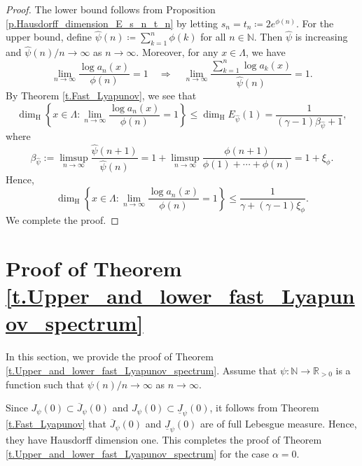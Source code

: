 \documentclass[12pt,reqno]{amsart}
\renewcommand{\=}{\coloneqq}
\theoremstyle{plain}
\begin{document}
\begin{proof}
The lower bound follows from Proposition \ref{p.Hausdorff_dimension_E_s_n_t_n} by letting $s_n=t_n \coloneqq 2e^{\phi(n)}$. For the upper bound, define $\widehat{\psi}(n)\coloneqq \sum_{k=1}^
        n \phi(k)$ for all $n \in \mathbb N$. Then $\widehat{\psi}$ is increasing and $\widehat{\psi}(n)/n\to \infty$ as $n \to \infty$. Moreover, for any $x\in \Lambda$, we have
        \begin{equation*}
                \lim_{n\to \infty}\frac{\log a_n(x)}{\phi(n)}=1
                 \quad \Longrightarrow \quad
                \lim_{n\to \infty}\frac{\sum^n_{k=1}\log a_k(x)}{\widehat{\psi}(n)}=1.
        \end{equation*}
        By Theorem \ref{t.Fast_Lyapunov}, we see that
        \begin{equation*}
                \dim_{\mathrm{H}}\left\{ x\in \Lambda:\lim_{n\to \infty}
                \frac{\log a_n(x)}{\phi(n)}=1 \right\}
                \leq \dim_{\mathrm{H}}E_{\widehat{\psi}}(1)
                =\frac{1}{(\gamma-1)\beta_{\widehat{\psi}}+1},
        \end{equation*}
   where
        \begin{equation*}
                \beta_{\widehat{\psi}}
                :=\limsup_{n\to\infty}
                \frac{\widehat{\psi}(n+1)}{\widehat{\psi}(n)}
                =1+\limsup_{n\to\infty}\frac{\phi(n+1)}{\phi(1)+\cdots +\phi(n)}
                =1+\xi_\phi.
        \end{equation*}
Hence,  \begin{equation*}
                \dim_{\mathrm{H}}
                \left\{x\in  \Lambda:\lim_{n\to \infty }
                \frac{\log a_n(x)}{\phi(n)}=1\right\}
                \leq \frac{1}{\gamma+(\gamma-1)\xi_\phi}.
        \end{equation*}
        We complete the proof.
\end{proof}


\section{Proof of Theorem \ref{t.Upper_and_lower_fast_Lyapunov_spectrum}}\label{s.proofoftheoremb}

In this section, we provide the proof of Theorem \ref{t.Upper_and_lower_fast_Lyapunov_spectrum}.
Assume that $\psi:\mathbb{N}\to\mathbb{R}_{>0}$ is a function such that $\psi(n)/n \to \infty$ as $n\to \infty$.

Since $J_\psi(0) \subset \overline{J}_\psi(0)$ and $J_\psi(0) \subset \underline{J}_\psi(0)$, it follows from Theorem \ref{t.Fast_Lyapunov} that $\overline{J}_\psi(0)$ and $\underline{J}_\psi(0)$ are of full Lebesgue measure. Hence, they have Hausdorff dimension one. This completes the proof of Theorem \ref{t.Upper_and_lower_fast_Lyapunov_spectrum} for the case $\alpha =0$.
\end{document}
